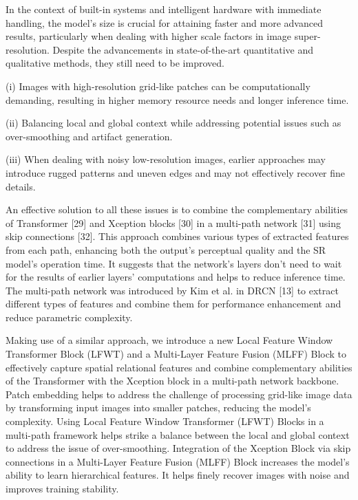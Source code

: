 \documentclass[twocolumn]{svjour3}          %
\begin{document}
In the context of built-in systems and intelligent hardware with immediate handling, the model's size is crucial for attaining faster and more advanced results, particularly when dealing with higher scale factors in image super-resolution. Despite the advancements in state-of-the-art quantitative and qualitative methods, they still need to be improved.

(i) Images with high-resolution grid-like patches can be computationally demanding, resulting in higher memory resource needs and longer inference time. 

(ii) Balancing local and global context while addressing potential issues such as over-smoothing and artifact generation. 

(iii) When dealing with noisy low-resolution images, earlier approaches may introduce rugged patterns and uneven edges and may not effectively recover fine details.

An effective solution to all these issues is to combine the complementary abilities of Transformer [29] and Xception blocks [30] in a multi-path network [31] using skip connections [32]. This approach combines various types of extracted features from each path, enhancing both the output's perceptual quality and the SR model's operation time. It suggests that the network's layers don't need to wait for the results of earlier layers' computations and helps to reduce inference time. The multi-path network was introduced by Kim et al. in DRCN [13] to extract different types of features and combine them for performance enhancement and reduce parametric complexity. 

Making use of a similar approach, we introduce a new Local Feature Window Transformer Block (LFWT) and a Multi-Layer Feature Fusion (MLFF) Block to effectively capture spatial relational features and combine complementary abilities of the Transformer with the Xception block in a multi-path network backbone. Patch embedding helps to address the challenge of processing grid-like image data by transforming input images into smaller patches, reducing the model's complexity. Using Local Feature Window Transformer (LFWT) Blocks in a multi-path framework helps strike a balance between the local and global context to address the issue of over-smoothing.  Integration of the Xception Block via skip connections in a Multi-Layer Feature Fusion (MLFF) Block increases the model’s ability to learn hierarchical features. It helps finely recover images with noise and improves training stability.
\end{document}
